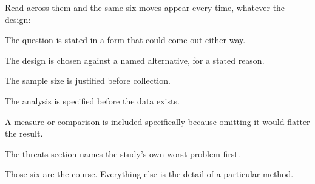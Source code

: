 \begin{conceptbox}
Read across them and the same six moves appear every time, whatever the design:

\begin{tightnum}
  \item The question is stated in a form that could come out either way.
  \item The design is chosen against a named alternative, for a stated reason.
  \item The sample size is justified before collection.
  \item The analysis is specified before the data exists.
  \item A measure or comparison is included specifically because omitting it
    would flatter the result.
  \item The threats section names the study's own worst problem first.
\end{tightnum}

\medskip
Those six are the course. Everything else is the detail of a particular method.
\end{conceptbox}
